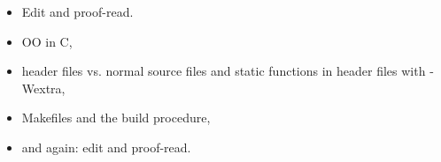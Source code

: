 \documentclass[11pt,onecolumn]{article}
\newcommand{\head}[1]{\vspace{0.4em}\noindent{\bf #1}}
\begin{document}
\head{TODO}
\begin{itemize}[itemsep=0pt,topsep=1pt,parsep=1pt,leftmargin=2.5em]
\item Edit and proof-read.
\item OO in C,
\item header files vs. normal source files and static functions in
  header files with -Wextra,
\item Makefiles and the build procedure, 
\item and again: edit and proof-read.
\end{itemize}
\end{document}
